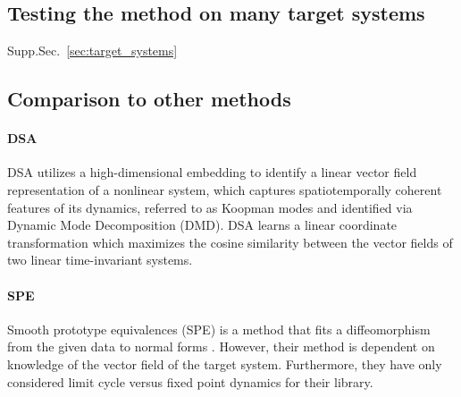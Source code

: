 \documentclass{article}
\theoremstyle{definition} \newtheorem{definition}{Definition}  \newtheorem{example}{Example}
\theoremstyle{remark} \newtheorem{remark}{Remark}
\newcounter{ct}
\begin{document}
\subsection{Testing the method on many target systems}\label{sec:testing}
Supp.Sec.~\ref{sec:target_systems}


\subsection{Comparison to other methods}\label{sec:compare_method}


\paragraph{DSA}
DSA utilizes a high-dimensional embedding to identify a linear vector field representation of a nonlinear system, which captures spatiotemporally coherent features of its dynamics, referred to as Koopman modes and identified via Dynamic Mode Decomposition (DMD).
DSA learns a linear coordinate transformation which maximizes the cosine similarity between the vector fields of two linear time-invariant systems\citep{ostrow2024beyond}.




\paragraph{SPE}
Smooth prototype equivalences (SPE) is a method that fits a diffeomorphism from the given data to normal forms \citep{friedman2025characterizing}.
However, their method is dependent on knowledge of the vector field of the target system.
Furthermore, they have only considered limit cycle versus fixed point dynamics for their library.


\end{document}
